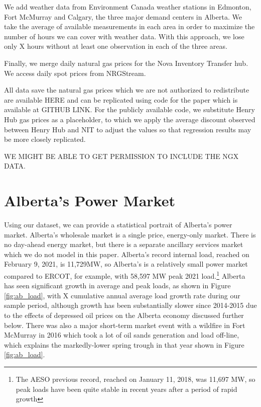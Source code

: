 \documentclass[12pt]{article}
\begin{document}
We add weather data from Environment Canada weather stations in Edmonton, Fort McMurray and Calgary, the three major demand centers in Alberta.  We take the average of available measurements in each area in order to maximize the number of hours we can cover with weather data. With this approach, we lose only X hours without at least one observation in each of the three areas.


Finally, we merge daily natural gas prices for the Nova Inventory Transfer hub.  We access daily spot prices from NRGStream.


All data save the natural gas prices which we are not authorized to redistribute are available HERE and can be replicated using code for the paper which is available at GITHUB LINK. For the publicly available code, we substitute Henry Hub gas prices as a placeholder, to which we apply the average discount observed between Henry Hub and NIT to adjust the values so that regression results may be more closely replicated.

WE MIGHT BE ABLE TO GET PERMISSION TO INCLUDE THE NGX DATA.


\section{Alberta's Power Market}

Using our dataset, we can provide a statistical portrait of Alberta's power market. Alberta's wholesale market is a single price, energy-only market. There is no day-ahead energy market, but there is a separate ancillary services market which we do not model in this paper.  Alberta's record internal load, reached on February 9, 2021, is 11,729MW, so Alberta's is a relatively small power market compared to ERCOT, for example, with 58,597 MW peak 2021 load.\footnote{The AESO previous record, reached on January 11, 2018, was 11,697 MW, so peak loads have been quite stable in recent years after a period of rapid growth} Alberta has seen significant growth in average and peak loads, as shown in Figure \ref{fig:ab_load}, with X cumulative annual average load growth rate during our sample period, although growth has been substantially slower since 2014-2015 due to the effects of depressed oil prices on the Alberta economy discussed further below. There was also a major short-term market event with a wildfire in Fort McMurray in 2016 which took a lot of oil sands generation and load off-line, which explains the markedly-lower spring trough in that year shown in Figure \ref{fig:ab_load}.
\end{document}
